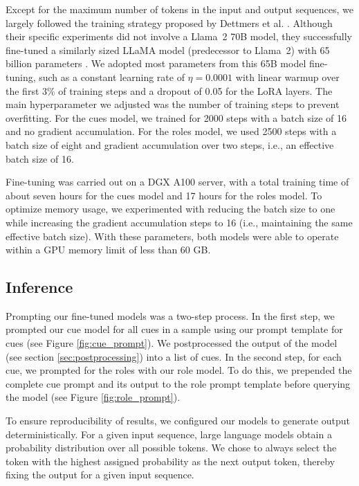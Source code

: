 \documentclass[11pt,a4paper]{article}
\begin{document}
Except for the maximum number of tokens in the input and output sequences, we largely followed the training strategy proposed by Dettmers et al. \cite{Dettmers2023}.
Although their specific experiments did not involve a Llama~2 70B model, they successfully fine-tuned a similarly sized LLaMA model (predecessor to Llama~2) with 65 billion parameters \cite{Touvron2023a}.
We adopted most parameters from this 65B model fine-tuning, such as a constant learning rate of $\eta=0.0001$ with linear warmup over the first 3\% of training steps and a dropout of 0.05 for the LoRA layers.
The main hyperparameter we adjusted was the number of training steps to prevent overfitting.
For the cues model, we trained for 2000 steps with a batch size of 16 and no gradient accumulation.
For the roles model, we used 2500 steps with a batch size of eight and gradient accumulation over two steps, i.e., an effective batch size of 16.

Fine-tuning was carried out on a DGX A100 server, with a total training time of about seven hours for the cues model and 17 hours for the roles model.
To optimize memory usage, we experimented with reducing the batch size to one while increasing the gradient accumulation steps to 16 (i.e., maintaining the same effective batch size).
With these parameters, both models were able to operate within a GPU memory limit of less than 60 GB.

 
\subsection{Inference}
\label{sec:inference}

Prompting our fine-tuned models was a two-step process.
In the first step, we prompted our cue model for all cues in a sample using our prompt template for cues (see Figure \ref{fig:cue_prompt}).
We postprocessed the output of the model (see section \ref{sec:postprocessing}) into a list of cues.
In the second step, for each cue, we prompted for the roles with our role model.
To do this, we prepended the complete cue prompt and its output to the role prompt template before querying the model (see Figure \ref{fig:role_prompt}).

To ensure reproducibility of results, we configured our models to generate output deterministically. 
For a given input sequence, large language models obtain a probability distribution over all possible tokens. 
We chose to always select the token with the highest assigned probability as the next output token, thereby fixing the output for a given input sequence.
 
\end{document}
